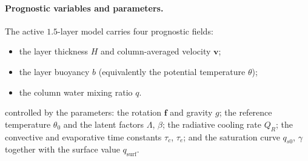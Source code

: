\documentclass{article}
\begin{document}
\paragraph{Prognostic variables and parameters.} The active $1.5$-layer model carries four prognostic fields:
\begin{itemize}
    \item the layer thickness $H$ and column-averaged velocity $\mathbf{v}$;
    \item the layer buoyancy $b$ (equivalently the potential temperature $\theta$);
    \item the column water mixing ratio $q$.
\end{itemize}
controlled by the parameters: the rotation $\mathbf{f}$ and gravity $g$; the reference temperature $\theta_0$ and the latent factors $\Lambda$, $\beta$; the radiative cooling rate $Q_R$; the convective and evaporative time constants $\tau_c$, $\tau_e$; and the saturation curve $q_{s0}$, $\gamma$ together with the surface value $q_{\mathrm{surf}}$.
\end{document}

